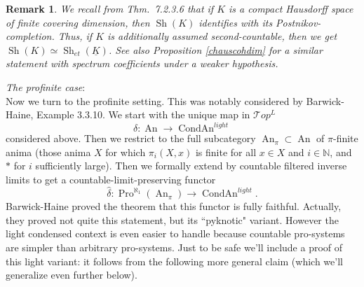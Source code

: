 \documentclass[12pt]{article}
\newtheorem{remark}[theorem]{Remark}
\newcommand{\on}{\operatorname}
\begin{document}
\begin{remark}
We recall from \cite{LurieHTT} Thm.\ 7.2.3.6 that if $K$ is a compact Hausdorff space of finite covering dimension, then $\on{Sh}(K)$ identifies with its Postnikov-completion.  Thus, if $K$ is additionally assumed second-countable, then we get $\on{Sh}(K)\simeq \on{Sh}_{et}(\underline{K})$. See also Proposition \ref{chauscohdim} for a similar statement with spectrum coefficients under a weaker hypothesis.\end{remark}


\noindent\textit{The profinite case}:\label{profiniteanima}\\


Now we turn to the profinite setting.  This was notably considered by Barwick-Haine, \cite{BarwickPyknotic} Example 3.3.10.  We start with the unique map in $\mathcal{T}op^L$
$$\delta: \on{An}\rightarrow \on{CondAn}^{light}$$
considered above.  Then we restrict to the full subcategory $\on{An}_{\pi}\subset\on{An}$ of $\pi$-finite anima (those anima $X$ for which $\pi_i(X,x)$ is finite for all $x\in X$ and $i\in\mathbb{N}$, and $\ast$ for $i$ sufficiently large).  Then we formally extend by countable filtered inverse limits to get a countable-limit-preserving functor
$$\widehat{\delta}:\on{Pro}^{\aleph_1}(\on{An}_\pi)\rightarrow \on{CondAn}^{light}.$$
Barwick-Haine proved the theorem that this functor is fully faithful.  Actually, they proved not quite this statement, but its ``pyknotic" variant.  However the light condensed context is even easier to handle because countable pro-systems are simpler than arbitrary pro-systems.  Just to be safe we'll include a proof of this light variant: it follows from the following more general claim (which we'll generalize even further below).
\end{document}
